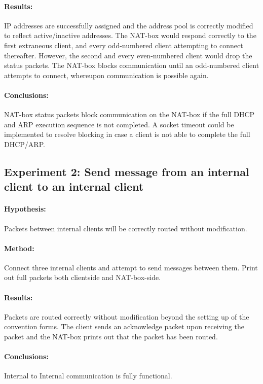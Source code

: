 \documentclass[12pt, a4paper]{article}
\begin{document}
\paragraph{Results:}
IP addresses are successfully assigned and the address pool is correctly modified to reflect active/inactive addresses.
The NAT-box would respond correctly to the first extraneous client, and every odd-numbered client attempting to connect thereafter. However, the second and every even-numbered client would drop the status packets. The NAT-box blocks communication until an odd-numbered client attempts to connect, whereupon communication is possible again.
\paragraph{Conclusions:}
NAT-box status packets block communication on the NAT-box if the full DHCP and ARP execution sequence is not completed. A socket timeout could be implemented to resolve blocking in case a client is not able to complete the full DHCP/ARP.

\subsection{Experiment 2: Send message from an internal client to an internal client}
\paragraph{Hypothesis:}
Packets between internal clients will be correctly routed without modification.
\paragraph{Method:}
Connect three internal clients and attempt to send messages between them. Print out full packets both clientside and NAT-box-side.
\paragraph{Results:}
Packets are routed correctly without modification beyond the setting up of the convention forms. The client sends an acknowledge packet upon receiving the packet and the NAT-box prints out that the packet has been routed.
\paragraph{Conclusions:}
Internal to Internal communication is fully functional.
\end{document}
